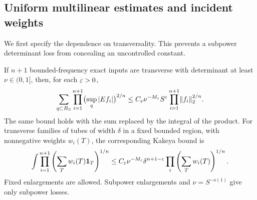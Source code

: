 \subsection{Uniform multilinear estimates and incident weights}

We first specify the dependence on transversality.  This prevents a
subpower determinant loss from concealing an uncontrolled constant.

\begin{lemma}
\label{t:multilinear}
If $n+1$ bounded-frequency exact inputs are transverse with determinant
at least $\nu\in(0,1]$, then, for each $\varepsilon>0$,
\begin{equation}\label{t:multilinear-extension}
 \sum_{q\subset B_S}\prod_{i=1}^{n+1}
       \bigl(\sup_q|Ef_i|\bigr)^{2/n}
 \le C_\varepsilon\nu^{-M_\varepsilon}S^\varepsilon
                    \prod_{i=1}^{n+1}\lVert f_i\rVert_2^{2/n}.
\end{equation}
The same bound holds with the sum replaced by the integral of the
product.  For transverse families of tubes of width $\delta$ in a fixed
bounded region, with nonnegative weights $w_i(T)$, the corresponding
Kakeya bound is
\begin{equation}\label{t:kakeya}
 \int\prod_{i=1}^{n+1}
       \left(\sum_Tw_i(T)\mathbf1_T\right)^{1/n}
 \le C_\varepsilon\nu^{-M_\varepsilon}\delta^{n+1-\varepsilon}
             \prod_i\left(\sum_Tw_i(T)\right)^{1/n}.
\end{equation}
Fixed enlargements are allowed.  Subpower enlargements and
$\nu=S^{-o(1)}$ give only subpower losses.
\end{lemma}

